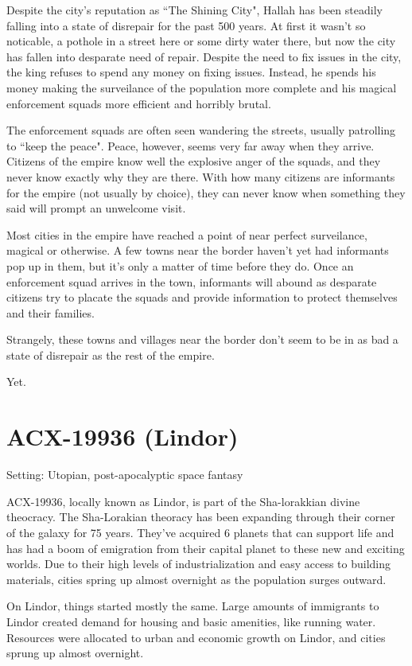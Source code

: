 Despite the city's reputation as ``The Shining City", Hallah has been steadily
falling into a state of disrepair for the past 500 years. At first it wasn't so
noticable, a pothole in a street here or some dirty water there, but now the
city has fallen into desparate need of repair. Despite the need to fix issues
in the city, the king refuses to spend any money on fixing issues. Instead, he
spends his money making the surveilance of the population more complete and his
magical enforcement squads more efficient and horribly brutal.

The enforcement squads are often seen wandering the streets, usually patrolling
to ``keep the peace". Peace, however, seems very far away when they arrive.
Citizens of the empire know well the explosive anger of the squads, and they
never know exactly why they are there. With how many citizens are informants
for the empire (not usually by choice), they can never know when something they
said will prompt an unwelcome visit.

Most cities in the empire have reached a point of near perfect surveilance,
magical or otherwise. A few towns near the border haven't yet had informants
pop up in them, but it's only a matter of time before they do. Once an
enforcement squad arrives in the town, informants will abound as desparate
citizens try to placate the squads and provide information to protect
themselves and their families.

Strangely, these towns and villages near the border don't seem to be in as bad
a state of disrepair as the rest of the empire.

Yet.


\section*{ACX-19936 (Lindor)}

Setting: Utopian, post-apocalyptic space fantasy

ACX-19936, locally known as Lindor, is part of the Sha-lorakkian divine
theocracy. The Sha-Lorakian theoracy has been expanding through their corner
of the galaxy for 75 years. They've acquired 6 planets that can support life
and has had a boom of emigration from their capital planet to these new and
exciting worlds. Due to their high levels of industrialization and easy access
to building materials, cities spring up almost overnight as the population
surges outward.

On Lindor, things started mostly the same. Large amounts of immigrants to
Lindor created demand for housing and basic amenities, like running water.
Resources were allocated to urban and economic growth on Lindor, and cities
sprung up almost overnight.

